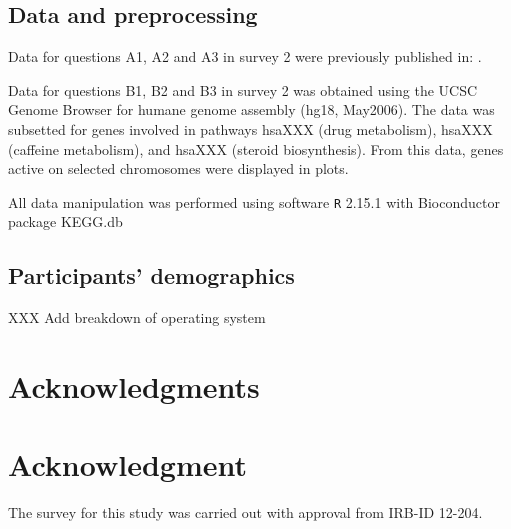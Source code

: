 \subsection*{Data and preprocessing}
Data for questions A1, A2 and A3 in survey 2 were previously published in: \citep{dawson:1995}.

Data for questions B1, B2 and B3 in survey 2 was obtained using the UCSC Genome Browser \cite{ucsc:2002} for humane genome assembly (hg18, May2006). The data was subsetted for genes involved in pathways hsaXXX (drug metabolism), hsaXXX (caffeine metabolism), and hsaXXX (steroid biosynthesis). From this data, genes active on selected chromosomes were displayed in plots.

All data manipulation was performed  using software {\tt R} 2.15.1 \citep{R} with Bioconductor package KEGG.db \cite{kegg}
%
\subsection*{Participants' demographics}
XXX Add breakdown of operating system

\ifCLASSOPTIONcompsoc
  \section*{Acknowledgments}
\else
  \section*{Acknowledgment}
\fi


The survey for this study was carried out with approval from  IRB-ID 12-204.


\ifCLASSOPTIONcaptionsoff
  \newpage
\fi





